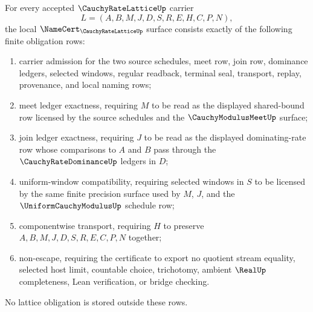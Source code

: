 \begin{theorem}
\label{thm:cauchy-rate-lattice-namecert-obligations}
For every accepted $\CauchyRateLatticeUp$ carrier
$$
L=(A,B,M,J,D,S,R,E,H,C,P,N),
$$
the local $\NameCert_{\CauchyRateLatticeUp}$ surface consists exactly of the following finite obligation rows:
\begin{enumerate}
\item carrier admission for the two source schedules, meet row, join row, dominance ledgers, selected windows, regular readback, terminal seal, transport, replay, provenance, and local naming rows;
\item meet ledger exactness, requiring $M$ to be read as the displayed shared-bound row licensed by the source schedules and the $\CauchyModulusMeetUp$ surface;
\item join ledger exactness, requiring $J$ to be read as the displayed dominating-rate row whose comparisons to $A$ and $B$ pass through the $\CauchyRateDominanceUp$ ledgers in $D$;
\item uniform-window compatibility, requiring selected windows in $S$ to be licensed by the same finite precision surface used by $M$, $J$, and the $\UniformCauchyModulusUp$ schedule row;
\item componentwise transport, requiring $H$ to preserve $A,B,M,J,D,S,R,E,C,P,N$ together;
\item non-escape, requiring the certificate to export no quotient stream equality, selected host limit, countable choice, trichotomy, ambient $\RealUp$ completeness, Lean verification, or bridge checking.
\end{enumerate}
No lattice obligation is stored outside these rows.
\end{theorem}
